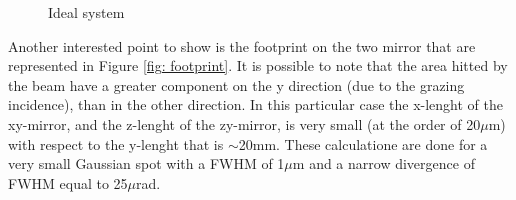 \begin{figure}[]
%
\centering
%
%
\quad
%
%
%
\caption{Ideal system}
%
\label{fig: ideal}
%
\end{figure}
%
Another interested point to show is the footprint on the two mirror that are represented in Figure \ref{fig: footprint}. It is possible to note that the area hitted by the beam have a greater component on the y direction (due to the grazing incidence), than in the other direction. In this particular case the x-lenght of the xy-mirror, and the z-lenght of the zy-mirror, is very small (at the order of 20$\mu $m) with respect to the y-lenght that is $\sim $20mm. These calculatione are done for a very small Gaussian spot with a FWHM of 1$\mu $m and a narrow divergence of FWHM equal to 25$\mu $rad.
